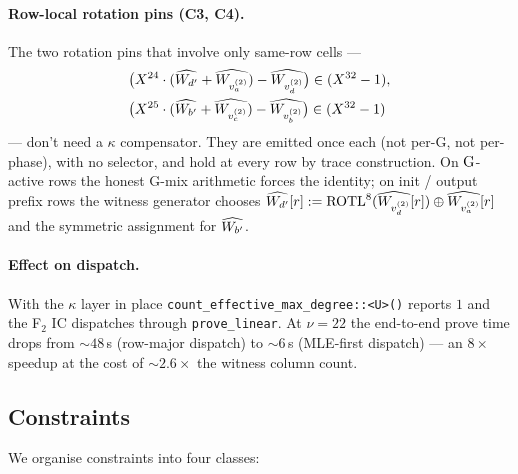 \paragraph{Row-local rotation pins (C3, C4).}
The two rotation pins that involve only same-row cells —
\begin{align}
&\bigl(X^{24} \cdot (\widehat{W_{d'}} + \widehat{W_{v_a^{(2)}}}) - \widehat{W_{v_d^{(2)}}}\bigr)
\in (X^{32}-1),\\
&\bigl(X^{25} \cdot (\widehat{W_{b'}} + \widehat{W_{v_c^{(2)}}}) - \widehat{W_{v_b^{(2)}}}\bigr)
\in (X^{32}-1)
\end{align}
— don't need a $\kappa$ compensator. They are emitted once each
(not per-G, not per-phase), with no selector, and hold at every row
by trace construction. On $\operatorname{G}$-active rows the honest G-mix
arithmetic forces the identity; on init / output prefix rows the
witness generator chooses
$\widehat{W_{d'}}[r] := \mathrm{ROTL}^{8}(\widehat{W_{v_d^{(2)}}}[r]) \oplus
\widehat{W_{v_a^{(2)}}}[r]$ and the symmetric assignment for $\widehat{W_{b'}}$.

\paragraph{Effect on dispatch.}
With the $\kappa$ layer in place
\texttt{count\_effective\_max\_degree::<U>()} reports $1$ and the
F$_2$ IC dispatches through \texttt{prove\_linear}. At $\nu = 22$ the
end-to-end prove time drops from \mbox{$\sim 48$\,s} (row-major
dispatch) to \mbox{$\sim 6$\,s} (MLE-first dispatch) — an
\mbox{$8\times$} speedup at the cost of $\sim 2.6\times$ the witness
column count.

\subsection{Constraints}\label{sec:b3-constraints}

We organise constraints into four classes:

